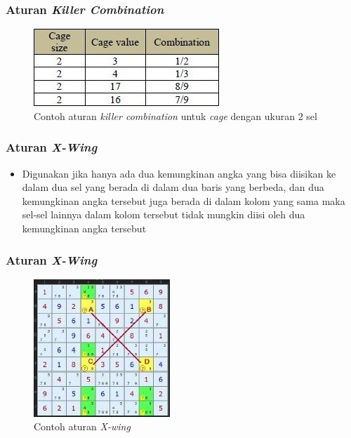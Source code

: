 \documentclass{beamer}
\begin{document}
\begin{frame}
\frametitle{Aturan \textit{Killer Combination}}
\begin{figure}
\centering
\captionsetup{justification=centering}
\includegraphics[scale=1]{Gambar/HybridGenetic5}
\caption[Contoh aturan  \textit{killer combination} untuk \textit{cage} dengan ukuran 2 sel]{Contoh aturan  \textit{killer combination} untuk \textit{cage} dengan ukuran 2 sel}
\label{fig:hybrid5}
\end{figure}
\end{frame}

\note{

}

\begin{frame}
\frametitle{Aturan \textit{X-Wing}}
\begin{itemize}
\item Digunakan jika hanya ada dua kemungkinan angka yang bisa diisikan ke dalam dua sel yang berada di dalam dua baris yang berbeda, dan dua kemungkinan angka tersebut juga berada di dalam kolom yang sama maka sel-sel lainnya dalam kolom tersebut tidak mungkin diisi oleh dua kemungkinan angka tersebut
\end{itemize}
\end{frame}


\begin{frame}
\frametitle{Aturan \textit{X-Wing}}
\begin{figure}
\centering
\captionsetup{justification=centering}
\includegraphics[scale=1]{Gambar/HybridGenetic6}
\caption[Contoh aturan  \textit{X-wing}  ~\cite{johanna:12:hybrid}]{Contoh aturan  \textit{X-wing} ~\cite{johanna:12:hybrid}}
\label{fig:hybrid6}
\end{figure}
\end{frame}
\end{document}
